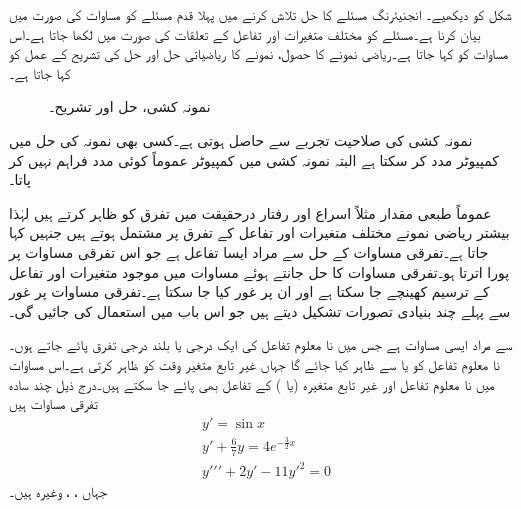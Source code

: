 شکل  کو دیکھیے۔ انجنیئرنگ مسئلے کا حل تلاش کرنے میں پہلا قدم مسئلے کو مساوات کی صورت میں بیان کرنا ہے۔مسئلے کو مختلف متغیرات اور تفاعل کے تعلقات کی صورت میں لکھا جاتا ہے۔اس مساوات کو  کہا جاتا ہے۔ریاضی نمونے کا حصول، نمونے کا ریاضیاتی حل اور حل کی تشریح کے عمل کو  کہا جاتا ہے۔
\begin{figure}
\centering
{}
\caption{نمونہ کشی، حل اور تشریح۔}
\label{شکل_سادہ_اول_نمونہ_کشی_عمل_الف}
\end{figure}
نمونہ کشی کی صلاحیت تجربے سے حاصل ہوتی ہے۔کسی بھی نمونہ کی حل میں کمپیوٹر مدد کر سکتا ہے البتہ نمونہ کشی میں کمپیوٹر عموماً کوئی مدد فراہم نہیں کر پاتا۔

عموماً طبعی مقدار مثلاً اسراع اور رفتار درحقیقت میں تفرق کو ظاہر کرتے ہیں لہٰذا بیشتر ریاضی نمونے مختلف متغیرات اور تفاعل کے تفرق پر مشتمل ہوتے ہیں جنہیں  کہا جاتا ہے۔تفرقی مساوات کے حل سے مراد ایسا تفاعل ہے جو اس تفرقی مساوات پر پورا اترتا ہو۔تفرقی مساوات کا حل جانتے ہوئے مساوات میں موجود متغیرات اور تفاعل کے ترسیم کھینچے جا سکتا ہے اور ان پر غور کیا جا سکتا ہے۔تفرقی مساوات پر غور سے پہلے چند بنیادی تصورات تشکیل دیتے ہیں جو اس باب میں استعمال کی جائیں گی۔


 سے مراد ایسی مساوات ہے جس میں نا معلوم تفاعل کی ایک درجی یا بلند درجی تفرق پائے جاتے ہوں۔نا معلوم تفاعل کو  یا  سے ظاہر کیا جائے گا جہاں غیر تابع متغیر  وقت کو ظاہر کرتی ہے۔اس مساوات میں نا معلوم تفاعل  اور غیر تابع متغیرہ  (یا ) کے تفاعل بھی پائے جا سکتے ہیں۔درج ذیل چند سادہ تفرقی مساوات ہیں
\begin{align}
&y'=\sin x \label{مساوات_سادہ_اول_اول_درجہ}\\
&y'+\frac{6}{7}y=4e^{-\frac{3}{2}x} \label{مساوات_سادہ_اول_دوسرا_درجہ}\\
&y'\!'\!'+2y'-11y'^2=0 \label{مساوات_سادہ_اول_تیسرا_درجہ}
\end{align}
جہاں ، ، وغیرہ ہیں۔

